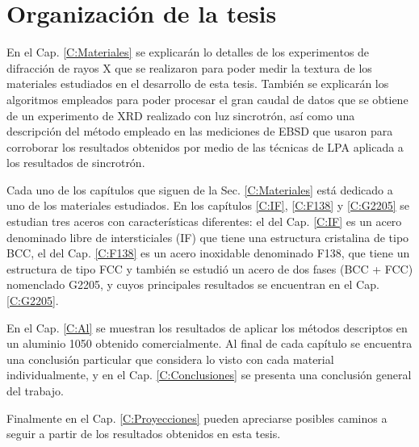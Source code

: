 
\section{Organización de la tesis}\label{S:Org}
En el Cap. \ref{C:Materiales} se explicarán lo detalles de los experimentos de difracción de rayos X que se realizaron para poder medir la textura de los materiales estudiados en el desarrollo de esta tesis. 
También se explicarán los algoritmos empleados para poder procesar el gran caudal de datos que se obtiene de un experimento de XRD realizado con luz sincrotrón, así como una descripción del método empleado en las mediciones de EBSD que usaron para corroborar los resultados obtenidos por medio de las técnicas de LPA aplicada a los resultados de sincrotrón.

Cada uno de los capítulos que siguen de la Sec. \ref{C:Materiales} está dedicado a uno de los materiales estudiados.
En los capítulos \ref{C:IF}, \ref{C:F138} y \ref{C:G2205} se estudian tres aceros con características diferentes: el del Cap. \ref{C:IF} es un acero denominado libre de intersticiales (IF) que tiene una estructura cristalina de tipo BCC, el del Cap. \ref{C:F138} es un acero inoxidable denominado F138, que tiene un estructura de tipo FCC y también se estudió un acero de dos fases (BCC + FCC) nomenclado G2205, y cuyos principales resultados se encuentran en el Cap. \ref{C:G2205}.

En el Cap. \ref{C:Al} se muestran los resultados de aplicar los métodos descriptos en un aluminio 1050 obtenido comercialmente.
Al final de cada capítulo se encuentra una conclusión particular que considera lo visto con cada material individualmente, y en el Cap. \ref{C:Conclusiones} se presenta una conclusión general del trabajo.

Finalmente en el Cap. \ref{C:Proyecciones} pueden apreciarse posibles caminos a seguir a partir de los resultados obtenidos en esta tesis.
